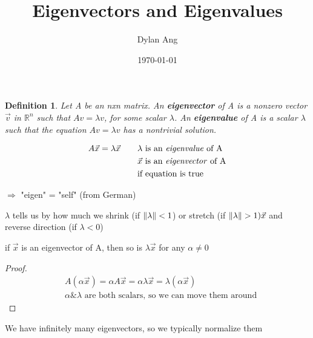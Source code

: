 \documentclass[12pt]{amsart}
\title{Eigenvectors and Eigenvalues}
\author{Dylan Ang}
\date{\today}
\newtheorem{definition}{Definition} %
\numberwithin{equation}{theorem}    %
\DeclarePairedDelimiter\norm{\lVert}{\rVert} %
\begin{document}
\maketitle

\tableofcontents

\begin{definition}
    Let A be an nxn matrix. An \textbf{eigenvector} of A is a nonzero vector $\vec{v}$ in $\mathbb{R}^n$ such that $Av=\lambda v$, for some scalar $\lambda$. An \textbf{eigenvalue} of A is a scalar $\lambda$ such that the equation $Av=\lambda v$ has a nontrivial solution.
\end{definition}

\begin{align}
    A\vec{x} = \lambda \vec{x} \qquad & \lambda \text{ is an \emph{eigenvalue} of A}  \\
                                      & \vec{x} \text{ is an \emph{eigenvector} of A} \\
                                      & \text{if equation is true}
\end{align}

$\Rightarrow$ "eigen" = "self" (from German)

$\lambda$ tells us by how much we shrink (if $\norm{\lambda} < 1$) or stretch (if $\norm{\lambda} > 1)\vec{x}$ and reverse direction (if $\lambda < 0$)



\begin{theorem}
    if $\vec{x}$ is an eigenvector of A, then so is $\lambda \vec{x}$ for any $\alpha \neq 0$
\end{theorem}


\begin{proof}
    \begin{align*}
         & A(\alpha \vec{x}) = \alpha A \vec{x} = \alpha \lambda \vec{x} = \lambda (\alpha \vec{x}) \\
         & \alpha \& \lambda \text{ are both scalars, so we can move them around}
    \end{align*}
\end{proof}

We have infinitely many eigenvectors, so we typically normalize them
\end{document}

